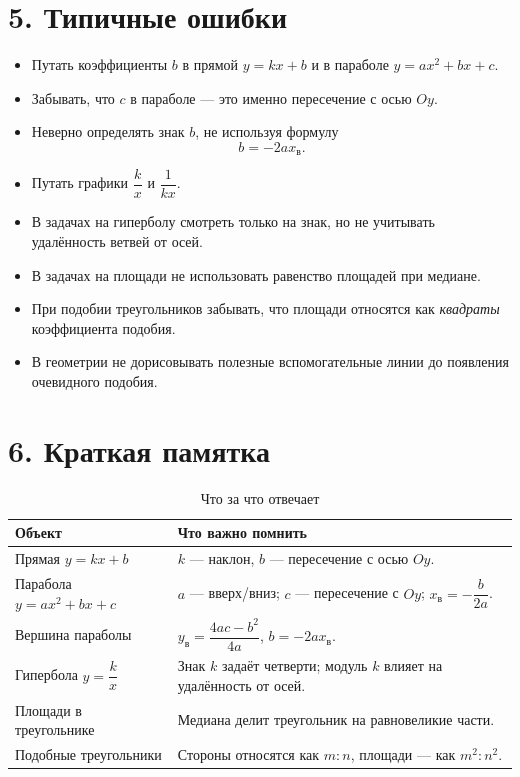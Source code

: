 \documentclass[a4paper,12pt]{article}
\begin{document}
\section*{5. Типичные ошибки}

\begin{itemize}
  \item Путать коэффициенты \(b\) в прямой \(y=kx+b\) и в параболе \(y=ax^2+bx+c\).
  \item Забывать, что \(c\) в параболе --- это именно пересечение с осью \(Oy\).
  \item Неверно определять знак \(b\), не используя формулу
  \[
  b=-2ax_{\text{в}}.
  \]
  \item Путать графики \(\dfrac{k}{x}\) и \(\dfrac{1}{kx}\).
  \item В задачах на гиперболу смотреть только на знак, но не учитывать удалённость ветвей от осей.
  \item В задачах на площади не использовать равенство площадей при медиане.
  \item При подобии треугольников забывать, что площади относятся как \emph{квадраты} коэффициента подобия.
  \item В геометрии не дорисовывать полезные вспомогательные линии до появления очевидного подобия.
\end{itemize}

\section*{6. Краткая памятка}

\begin{table}[h!]
\centering
\caption{Что за что отвечает}
\begin{tabularx}{\linewidth}{@{}lX@{}}
\toprule
\textbf{Объект} & \textbf{Что важно помнить} \\
\midrule
Прямая \(y=kx+b\) & \(k\) --- наклон, \(b\) --- пересечение с осью \(Oy\). \\
Парабола \(y=ax^2+bx+c\) & \(a\) --- вверх/вниз; \(c\) --- пересечение с \(Oy\); \(x_{\text{в}}=-\dfrac{b}{2a}\). \\
Вершина параболы & \(y_{\text{в}}=\dfrac{4ac-b^2}{4a}\), \quad \(b=-2ax_{\text{в}}\). \\
Гипербола \(y=\dfrac{k}{x}\) & Знак \(k\) задаёт четверти; модуль \(k\) влияет на удалённость от осей. \\
Площади в треугольнике & Медиана делит треугольник на равновеликие части. \\
Подобные треугольники & Стороны относятся как \(m:n\), площади --- как \(m^2:n^2\). \\
\bottomrule
\end{tabularx}
\end{table}
\end{document}
